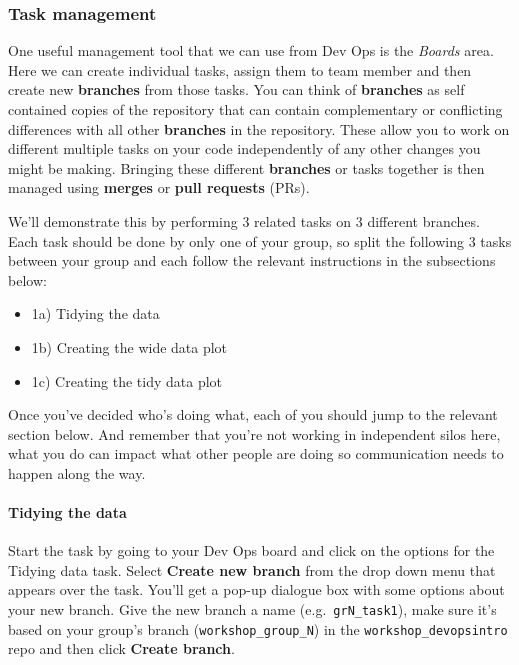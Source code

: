 \documentclass[
  12pt,
]{article}
\providecommand{\tightlist}{%
  \setlength{\itemsep}{0pt}\setlength{\parskip}{0pt}}
\begin{document}
\hypertarget{task-management}{%
\subsubsection{Task management}\label{task-management}}

One useful management tool that we can use from Dev Ops is the
\emph{Boards} area. Here we can create individual tasks, assign them to
team member and then create new \textbf{branches} from those tasks. You
can think of \textbf{branches} as self contained copies of the
repository that can contain complementary or conflicting differences
with all other \textbf{branches} in the repository. These allow you to
work on different multiple tasks on your code independently of any other
changes you might be making. Bringing these different \textbf{branches}
or tasks together is then managed using \textbf{merges} or \textbf{pull
requests} (PRs).

We'll demonstrate this by performing 3 related tasks on 3 different
branches. Each task should be done by only one of your group, so split
the following 3 tasks between your group and each follow the relevant
instructions in the subsections below:

\begin{itemize}
\tightlist
\item
  1a) Tidying the data
\item
  1b) Creating the wide data plot
\item
  1c) Creating the tidy data plot
\end{itemize}

Once you've decided who's doing what, each of you should jump to the
relevant section below. And remember that you're not working in
independent silos here, what you do can impact what other people are
doing so communication needs to happen along the way.

\hypertarget{tidying-the-data}{%
\paragraph{Tidying the data}\label{tidying-the-data}}

Start the task by going to your Dev Ops board and click on the options
for the Tidying data task. Select \textbf{Create new branch} from the
drop down menu that appears over the task. You'll get a pop-up dialogue
box with some options about your new branch. Give the new branch a name
(e.g.~\texttt{grN\_task1}), make sure it's based on your group's branch
(\texttt{workshop\_group\_N}) in the \texttt{workshop\_devopsintro} repo
and then click \textbf{Create branch}.
\end{document}
